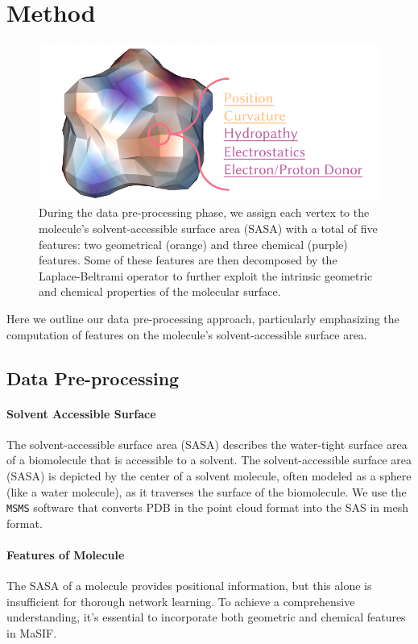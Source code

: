 \section{Method}

\begin{figure}[htp]
    \centering
    \includegraphics[width=0.5\linewidth]{figures/features.pdf}
    \caption{
        During the data pre-processing phase, we assign each vertex to the molecule's solvent-accessible surface area (SASA) with a total of five features: two geometrical (orange) and three chemical (purple) features.
        Some of these features are then decomposed by the Laplace-Beltrami operator to further exploit the intrinsic geometric and chemical properties of the molecular surface.
    }
    \label{fig:feature}
\end{figure}

Here we outline our data pre-processing approach, particularly emphasizing the computation of features on the molecule's solvent-accessible surface area.

\subsection{Data Pre-processing}

\paragraph{Solvent Accessible Surface}
The solvent-accessible surface area (SASA) describes the water-tight surface area of a biomolecule that is accessible to a solvent.
The solvent-accessible surface area (SASA) is depicted by the center of a solvent molecule, often modeled as a sphere (like a water molecule), as it traverses the surface of the biomolecule.
We use the \texttt{MSMS} \cite{MSMS} software that converts PDB in the point cloud format into the SAS in mesh format.

\paragraph{Features of Molecule}
The SASA of a molecule provides positional information, but this alone is insufficient for thorough network learning. To achieve a comprehensive understanding, it's essential to incorporate both geometric and chemical features in MaSIF\cite{MaSIF}.

